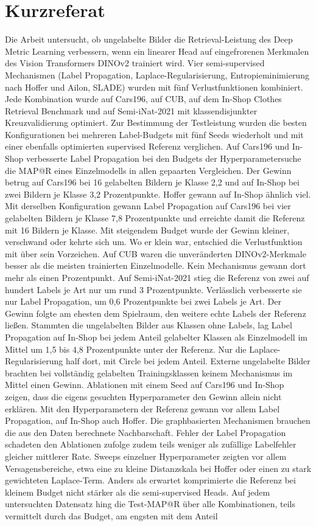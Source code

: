 
\section*{Kurzreferat}

Die Arbeit untersucht, ob ungelabelte Bilder die Retrieval-Leistung des Deep Metric Learning verbessern, wenn ein linearer Head auf eingefrorenen Merkmalen des Vision Transformers DINOv2 trainiert wird. Vier semi-supervised Mechanismen (Label Propagation, Laplace-Regularisierung, Entropieminimierung nach Hoffer und Ailon, SLADE) wurden mit fünf Verlustfunktionen kombiniert. Jede Kombination wurde auf Cars196, auf CUB, auf dem In-Shop Clothes Retrieval Benchmark und auf Semi-iNat-2021 mit klassendisjunkter Kreuzvalidierung optimiert. Zur Bestimmung der Testleistung wurden die besten Konfigurationen bei mehreren Label-Budgets mit fünf Seeds wiederholt und mit einer ebenfalls optimierten supervised Referenz verglichen. Auf Cars196 und In-Shop verbesserte Label Propagation bei den Budgets der Hyperparametersuche die MAP@R eines Einzelmodells in allen gepaarten Vergleichen. Der Gewinn betrug auf Cars196 bei 16 gelabelten Bildern je Klasse 2,2 und auf In-Shop bei zwei Bildern je Klasse 3,2 Prozentpunkte. Hoffer gewann auf In-Shop ähnlich viel. Mit derselben Konfiguration gewann Label Propagation auf Cars196 bei vier gelabelten Bildern je Klasse 7,8 Prozentpunkte und erreichte damit die Referenz mit 16 Bildern je Klasse. Mit steigendem Budget wurde der Gewinn kleiner, verschwand oder kehrte sich um. Wo er klein war, entschied die Verlustfunktion mit über sein Vorzeichen. Auf CUB waren die unveränderten DINOv2-Merkmale besser als die meisten trainierten Einzelmodelle. Kein Mechanismus gewann dort mehr als einen Prozentpunkt. Auf Semi-iNat-2021 stieg die Referenz von zwei auf hundert Labels je Art nur um rund 3 Prozentpunkte. Verlässlich verbesserte sie nur Label Propagation, um 0,6 Prozentpunkte bei zwei Labels je Art. Der Gewinn folgte am ehesten dem Spielraum, den weitere echte Labels der Referenz ließen. Stammten die ungelabelten Bilder aus Klassen ohne Labels, lag Label Propagation auf In-Shop bei jedem Anteil gelabelter Klassen als Einzelmodell im Mittel um 1,5 bis 4,8 Prozentpunkte unter der Referenz. Nur die Laplace-Regularisierung half dort, mit Circle bei jedem Anteil. Externe ungelabelte Bilder brachten bei vollständig gelabelten Trainingsklassen keinem Mechanismus im Mittel einen Gewinn. Ablationen mit einem Seed auf Cars196 und In-Shop zeigen, dass die eigens gesuchten Hyperparameter den Gewinn allein nicht erklären. Mit den Hyperparametern der Referenz gewann vor allem Label Propagation, auf In-Shop auch Hoffer. Die graphbasierten Mechanismen brauchen die aus den Daten berechnete Nachbarschaft. Fehler der Label Propagation schadeten den Ablationen zufolge zudem teils weniger als zufällige Labelfehler gleicher mittlerer Rate. Sweeps einzelner Hyperparameter zeigten vor allem Versagensbereiche, etwa eine zu kleine Distanzskala bei Hoffer oder einen zu stark gewichteten Laplace-Term. Anders als erwartet komprimierte die Referenz bei kleinem Budget nicht stärker als die semi-supervised Heads. Auf jedem untersuchten Datensatz hing die Test-MAP@R über alle Kombinationen, teils vermittelt durch das Budget, am engsten mit dem Anteil 